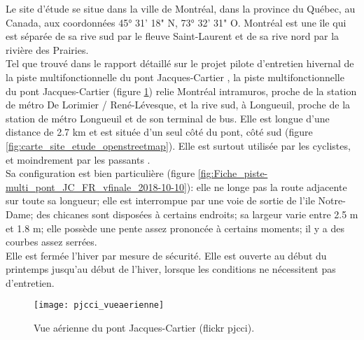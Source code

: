 ﻿\noindent Le site d'étude se situe dans la ville de Montréal, dans la province du Québec, au Canada, aux coordonnées 45° 31' 18" N, 73° 32' 31" O. Montréal est une île qui est séparée de sa rive sud par le fleuve Saint-Laurent et de sa rive nord par la rivière des Prairies.
\vspace{\baselineskip}
\\
\noindent Tel que trouvé dans le rapport détaillé sur le projet pilote d'entretien hivernal de la piste multifonctionnelle du pont Jacques-Cartier \parencite{pjcci_rapport_2018}, la piste multifonctionnelle du pont Jacques-Cartier (figure \ref{fig:pjcci_vueaerienne}) relie Montréal intramuros, proche de la station de métro De Lorimier / René-Lévesque, et la rive sud, à Longueuil, proche de la station de métro Longueuil et de son terminal de bus. Elle est longue d'une distance de 2.7 km et est située d'un seul côté du pont, côté sud (figure \ref{fig:carte_site_etude_openstreetmap}). Elle est surtout utilisée par les cyclistes, et moindrement par les passants \parencite{pjcci_rapport_2018}.
\vspace{\baselineskip}
\\
\noindent Sa configuration est bien particulière \parencite{pjcci_fiche_2018} (figure \ref{fig:Fiche_piste-multi_pont_JC_FR_vfinale_2018-10-10}): elle ne longe pas la route adjacente sur toute sa longueur; elle est interrompue par une voie de sortie de l'ile Notre-Dame; des chicanes sont disposées à certains endroits; sa largeur varie entre 2.5 m et 1.8 m; elle possède une pente assez prononcée à certains moments; il y a des courbes assez serrées.
\vspace{\baselineskip}
\\
\noindent Elle est fermée l'hiver par mesure de sécurité. Elle est ouverte au début du printemps jusqu'au début de l'hiver, lorsque les conditions ne nécessitent pas d'entretien.
\begin{figure}[H]
    \centering
    \texttt{[image: pjcci\_vueaerienne]}
    \caption[Vue aérienne du pont Jacques-Cartier]{Vue aérienne du pont Jacques-Cartier (flickr \acrshort{pjcci})\protect\footnotemark.}
    \label{fig:pjcci_vueaerienne}
\end{figure}
